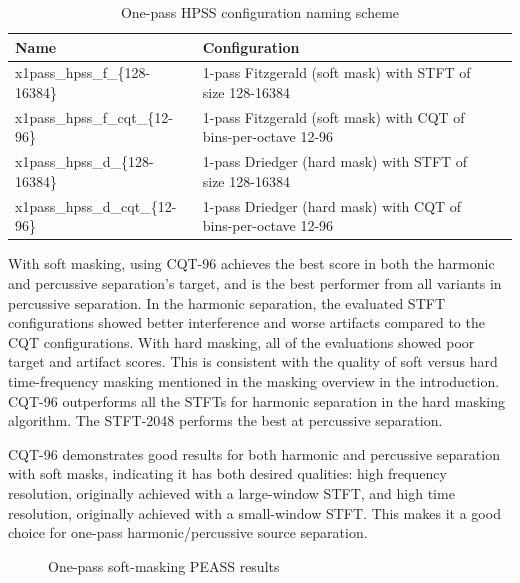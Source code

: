 \documentclass[letter,12pt]{article}
\begin{document}
\begin{table}[ht]
	\centering
\begin{tabular}{ |l|l| |c|c| }
	 \hline
	  Name & Configuration \\
	 \hline
	 \hline
	 x1pass\_hpss\_f\_\{128-16384\} & 1-pass Fitzgerald (soft mask) with STFT of size 128-16384 \\
	 \hline
	 x1pass\_hpss\_f\_cqt\_\{12-96\} & 1-pass Fitzgerald (soft mask) with CQT of bins-per-octave 12-96 \\
	 \hline
	 x1pass\_hpss\_d\_\{128-16384\} & 1-pass Driedger (hard mask) with STFT of size 128-16384 \\
	 \hline
	 x1pass\_hpss\_d\_cqt\_\{12-96\} & 1-pass Driedger (hard mask) with CQT of bins-per-octave 12-96 \\
	 \hline
\end{tabular}
	\caption{One-pass HPSS configuration naming scheme}
	\label{table:round1hpss}
\end{table}

With soft masking, using CQT-96 achieves the best score in both the harmonic and percussive separation's target, and is the best performer from all variants in percussive separation. In the harmonic separation, the evaluated STFT configurations showed better interference and worse artifacts compared to the CQT configurations. With hard masking, all of the evaluations showed poor target and artifact scores. This is consistent with the quality of soft versus hard time-frequency masking mentioned in the masking overview \cite{masking} in the introduction. CQT-96 outperforms all the STFTs for harmonic separation in the hard masking algorithm. The STFT-2048 performs the best at percussive separation.

CQT-96 demonstrates good results for both harmonic and percussive separation with soft masks, indicating it has both desired qualities: high frequency resolution, originally achieved with a large-window STFT, and high time resolution, originally achieved with a small-window STFT. This makes it a good choice for one-pass harmonic/percussive source separation.

\begin{figure}[ht]
	\centering
	\caption{One-pass soft-masking PEASS results}
	\label{fig:round1soft}
\end{figure}
\end{document}
